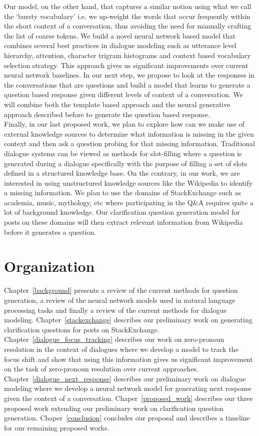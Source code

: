 \documentclass[11pt]{report}
\renewcommand\cite{\citep}	%
\begin{document}
\noindent
Our model, on the other hand, that captures a similar notion using what we call the `bursty vocabulary' i.e. we up-weight the words that occur frequently within the short context of a conversation, thus avoiding the need for manually crafting the list of coarse tokens. We build a novel neural network based model that combines several best practices in dialogue modeling such as utterance level hierarchy, attention, character trigram histograms and context based vocabulary selection strategy. This approach gives us significant improvements over current neural network baselines. In our next step, we propose to look at the responses in the conversations that are questions and build a model that learns to generate a question based response given different levels of context of a conversation. We will combine both the template based approach and the neural generative approach described before to generate the question based response. \\

\noindent
Finally, in our last proposed work, we plan to explore how can we make use of external knowledge sources to determine what information is missing in the given context and then ask a question probing for that missing information. Traditional dialogue systems \cite{lemon2006isu} can be viewed as methods for slot-filling where a question is generated during a dialogue specifically with the purpose of filling a set of slots defined in a structured knowledge base. On the contrary, in our work, we are interested in using unstructured knowledge sources like the Wikipedia to identify a missing information. We plan to use the domains of StackExchange such as academia, music, mythology, etc where participating in the Q\&A requires quite a lot of background knowledge. Our clarification question generation model for posts on these domains will then extract relevant information from Wikipedia before it generates a question. 

\section{Organization}

Chapter~\ref{background} presents a review of the current methods for question generation, a review of the neural network models used in natural language processing tasks and finally a review of the current methods for dialogue modeling. 
Chapter~\ref{stackexchange} describes our preliminary work on generating clarification questions for posts on StackExchange. Chapter~\ref{dialogue_focus_tracking} describes our work on zero-pronoun resolution in the context of dialogues where we develop a model to track the focus shift and show that using this information gives us significant improvement on the task of zero-pronoun resolution over current approaches. Chapter~\ref{dialogue_next_response} describes our preliminary work on dialogue modeling where we develop a neural network model for generating next response given the context of a conversation. Chaper~\ref{proposed_work} describes our three proposed work extending our preliminary work on clarification question generation. Chaper~\ref{conclusion} concludes our proposal and describes a timeline for our remaining proposed works.
\end{document}
